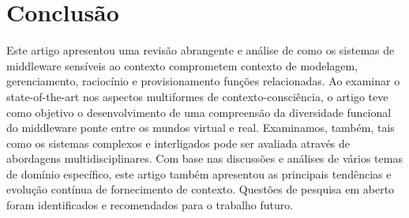 \documentclass[12pt]{article} %
\begin{document}

\section{Conclusão} %


Este artigo apresentou uma revisão abrangente e análise de como os sistemas de middleware sensíveis ao contexto comprometem contexto de modelagem, gerenciamento, raciocínio e provisionamento funções relacionadas. Ao examinar o state-of-the-art nos aspectos multiformes de contexto-consciência, o artigo teve como objetivo o desenvolvimento de uma compreensão da diversidade funcional do middleware ponte entre os mundos virtual e real. Examinamos, também, tais como os sistemas complexos e interligados pode ser avaliada através de abordagens multidisciplinares. Com base nas discussões e análises de vários temas de domínio específico, este artigo também apresentou as principais tendências e evolução contínua de fornecimento de contexto. Questões de pesquisa em aberto foram identificados e recomendados para o trabalho futuro.



 

\end{document}
